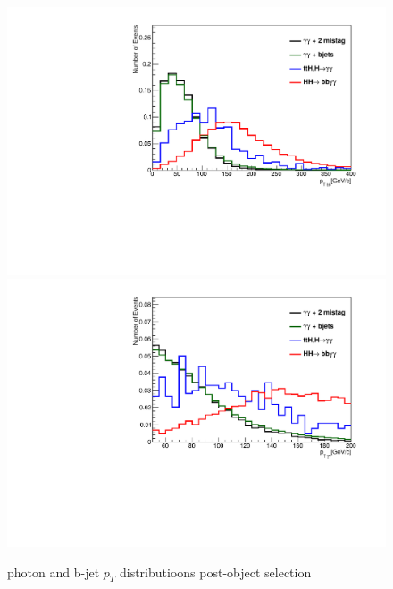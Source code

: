 \documentclass{cmspaper}
\begin{document}
\begin{figure}
\includegraphics[scale=0.35, angle=0]{figures/dibjetPt_ps_normalized.pdf}	
\includegraphics[scale=0.35, angle=0]{figures/diphotonPt_ps_normalized.pdf}	
\caption{photon and b-jet $p_{T}$ distributioons post-object selection}
\label{fig:Ptcuts}
\end{figure}
\end{document}
